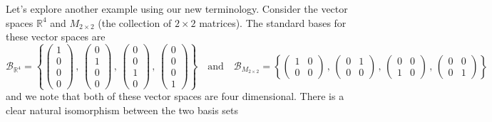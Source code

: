 Let's explore another example using our new terminology.  Consider the vector spaces
$\mathbb{R}^4$ and $M_{2 \times 2}$ (the collection of $2 \times 2$ matrices).  The
standard bases for these vector spaces are
\[ \mathcal{B}_{\mathbb{R}^4} = \left\{ \begin{pmatrix}1\\0\\0\\0\end{pmatrix}\,,\,
    \begin{pmatrix}0\\1\\0\\0\end{pmatrix}\,,\,
    \begin{pmatrix}0\\0\\1\\0\end{pmatrix}\,,\,
    \begin{pmatrix}0\\0\\0\\1\end{pmatrix}\right\} \quad \text{and} \quad
    \mathcal{B}_{M_{2 \times 2}} = \left\{ \begin{pmatrix}1&0\\0&0\end{pmatrix}\,,\,
    \begin{pmatrix}0&1\\0&0\end{pmatrix}\,,\,
    \begin{pmatrix}0&0\\1&0\end{pmatrix}\,,\,
    \begin{pmatrix}0&0\\0&1\end{pmatrix}\right\}
\]
and we note that both of these vector spaces are four dimensional.  
There is a clear natural isomorphism between the two basis sets
